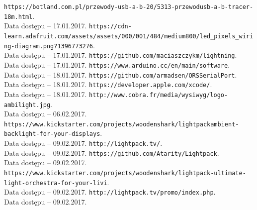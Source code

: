 \documentclass[12pt]{report}
\begin{document}
\begin{thebibliography}{99}
 {\tt https://botland.com.pl/przewody-usb-a-b-20/5313-przewod\-usb-a-b-tracer-18m.html}.\\Data dostępu -- 17.01.2017.
 {\tt https://cdn-learn.adafruit.com/assets/assets/000/001/484/\-medium800/led\_pixels\_wiring-diagram.png?1396773276}.\\Data dostępu -- 17.01.2017.
 {\tt https://github.com/maciaszczykm/lightning}.\\Data dostępu -- 17.01.2017.
 {\tt https://www.arduino.cc/en/main/software}.\\Data dostępu -- 18.01.2017.
 {\tt https://github.com/armadsen/ORSSerialPort}.\\Data dostępu -- 18.01.2017.
 {\tt https://developer.apple.com/xcode/}.\\Data dostępu -- 18.01.2017.
 {\tt http://www.cobra.fr/media/wysiwyg/logo-ambilight.jpg}. \\Data dostępu -- 06.02.2017.
 {\tt https://www.kickstarter.com/projects/woodenshark/lightpack\-ambient-backlight-for-your-displays}. \\Data dostępu -- 09.02.2017.
 {\tt http://lightpack.tv/}. \\Data dostępu -- 09.02.2017.
 {\tt https://github.com/Atarity/Lightpack}. \\Data dostępu -- 09.02.2017.
 {\tt https://www.kickstarter.com/projects/woodenshark/lightpack-ultimate-light-orchestra-for-your-livi}. \\Data dostępu -- 09.02.2017.
 {\tt http://lightpack.tv/promo/index.php}. \\Data dostępu -- 09.02.2017.

\end{thebibliography}

\listoffigures

\listoftables

\lstlistoflistings
\end{document}
